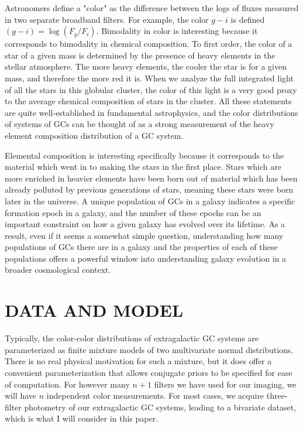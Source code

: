 \documentclass{article}
\begin{document}
Astronomers define a "color" as the difference between the logs of fluxes measured in two
separate broadband filters. For example, the color $g-i$ is defined $(g-i)=\log(F_g/F_i)$. Bimodality in color
is interesting because it corresponds to bimodality in chemical composition. To first order, the color of a star of a given
mass is determined by the presence of heavy elements in the stellar atmosphere. The more heavy elements, the
cooler the star is for a given mass, and therefore the more red it is. When we analyze the full integrated light of
all the stars in this globular cluster, the color of this light is a very good proxy to the average chemical composition
of stars in the cluster. All these statements are quite well-established in fundamental astrophysics, and the color
distributions of systems of GCs can be thought of as a strong measurement of the heavy element composition distribution
of a GC system.

Elemental composition is interesting specifically because it corresponds to the material which went in to making the stars
in the first place. Stars which are more enriched in heavier elements have been born out of material which has been already
polluted by previous generations of stars, meaning these stars were born later in the universe. A unique population of GCs
in a galaxy indicates a specific formation epoch in a galaxy, and the number of these epochs can be an important constraint
on how a given galaxy has evolved over its lifetime. As a result, even if it seems a somewhat simple question, understanding
how many populations of GCs there are in a galaxy and the properties of each of these populations offers a powerful
window into understanding galaxy evolution in a broader cosmological context.

\section{DATA AND MODEL}
Typically, the color-color distributions of extragalactic GC systems are parameterized as
finite mixture models of two multivariate normal distributions. There is no real physical motivation
for such a mixture, but it does offer a convenient parameterization that allows conjugate priors to be specified
for ease of computation. For however many $n+1$ filters we have used for our imaging, we will
have $n$ independent color measurements. For most cases, we acquire three-filter photometry of our extragalactic
GC systems, leading to a bivariate dataset, which is what I will consider in this paper.
\end{document}
